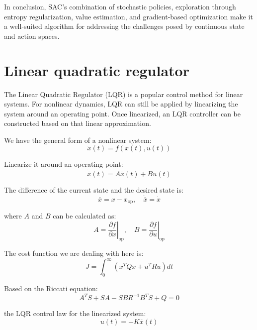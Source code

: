 In conclusion, SAC's combination of stochastic policies, exploration through
entropy regularization, value estimation, and gradient-based optimization make
it a well-suited algorithm for addressing the challenges posed by continuous
state and action spaces.

\section{Linear quadratic regulator}
The Linear Quadratic Regulator (LQR) is a popular control method for linear systems. For nonlinear dynamics, LQR can still be applied by linearizing the system around an operating point. Once linearized, an LQR controller can be constructed based on that linear approximation.

We have the general form of a nonlinear system:
\begin{equation}
    \dot{x}(t) = f(x(t), u(t))
\end{equation}

Linearize it around an operating point:
\begin{equation}
    \dot{\overline{x}}(t) = A \overline{x}(t) + B u(t)
\end{equation}

The difference of the current state and the desired state is:
\begin{equation}
    \overline{x} = x - x_{\text{op}}, \quad \dot{\overline{x}} = \dot{x}
\end{equation}

where \(A\) and \(B\) can be calculated as:
\begin{equation}
    A = \left.\frac{\partial f}{\partial x}\right|_{\text{op}}, \quad B = \left.\frac{\partial f}{\partial u}\right|_{\text{op}}
\end{equation}

The cost function we are dealing with here is:
\begin{equation}
J = \int_0^{\infty} \left( x^T Q x + u^T R u \right) dt
\end{equation}

Based on the Riccati equation:
\begin{equation}
    A^T S + SA - SBR^{-1}B^T S + Q = 0
\end{equation}

 the LQR control law for the linearized system:
\begin{equation}
    u(t) = -K\overline{x}(t)
\end{equation}

